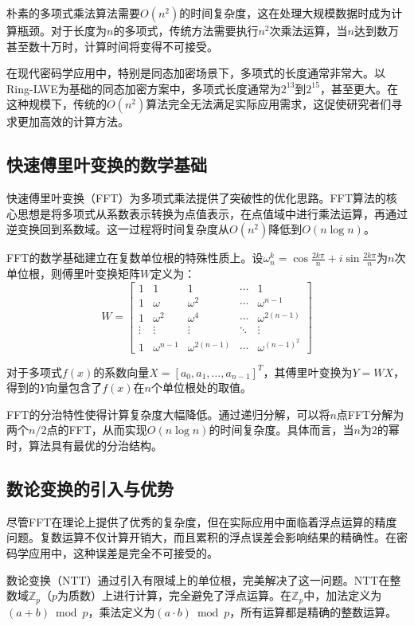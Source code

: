 \documentclass[a4paper]{article}
\begin{document}
朴素的多项式乘法算法需要$O(n^2)$的时间复杂度，这在处理大规模数据时成为计算瓶颈。对于长度为$n$的多项式，传统方法需要执行$n^2$次乘法运算，当$n$达到数万甚至数十万时，计算时间将变得不可接受。

在现代密码学应用中，特别是同态加密场景下，多项式的长度通常非常大。以Ring-LWE为基础的同态加密方案中，多项式长度通常为$2^{13}$到$2^{15}$，甚至更大。在这种规模下，传统的$O(n^2)$算法完全无法满足实际应用需求，这促使研究者们寻求更加高效的计算方法。

\subsection{快速傅里叶变换的数学基础}

快速傅里叶变换（FFT）为多项式乘法提供了突破性的优化思路。FFT算法的核心思想是将多项式从系数表示转换为点值表示，在点值域中进行乘法运算，再通过逆变换回到系数域。这一过程将时间复杂度从$O(n^2)$降低到$O(n\log n)$。

FFT的数学基础建立在复数单位根的特殊性质上。设$\omega_n^k = \cos\frac{2k\pi}{n} + i\sin\frac{2k\pi}{n}$为$n$次单位根，则傅里叶变换矩阵$W$定义为：
$$W = \begin{bmatrix}
1 & 1 & 1 & \cdots & 1 \\
1 & \omega & \omega^2 & \cdots & \omega^{n-1} \\
1 & \omega^2 & \omega^4 & \cdots & \omega^{2(n-1)} \\
\vdots & \vdots & \vdots & \ddots & \vdots \\
1 & \omega^{n-1} & \omega^{2(n-1)} & \cdots & \omega^{(n-1)^2}
\end{bmatrix}$$

对于多项式$f(x)$的系数向量$X = [a_0, a_1, \ldots, a_{n-1}]^T$，其傅里叶变换为$Y = WX$，得到的$Y$向量包含了$f(x)$在$n$个单位根处的取值。

FFT的分治特性使得计算复杂度大幅降低。通过递归分解，可以将$n$点FFT分解为两个$n/2$点的FFT，从而实现$O(n\log n)$的时间复杂度。具体而言，当$n$为$2$的幂时，算法具有最优的分治结构。

\subsection{数论变换的引入与优势}

尽管FFT在理论上提供了优秀的复杂度，但在实际应用中面临着浮点运算的精度问题。复数运算不仅计算开销大，而且累积的浮点误差会影响结果的精确性。在密码学应用中，这种误差是完全不可接受的。

数论变换（NTT）通过引入有限域上的单位根，完美解决了这一问题。NTT在整数域$\mathbb{Z}_p$（$p$为质数）上进行计算，完全避免了浮点运算。在$\mathbb{Z}_p$中，加法定义为$(a + b) \bmod p$，乘法定义为$(a \cdot b) \bmod p$，所有运算都是精确的整数运算。
\end{document}
